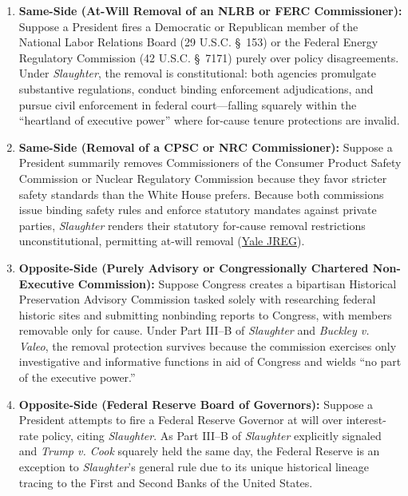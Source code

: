 \documentclass[12pt]{article}
\begin{document}
\begin{enumerate}
    \item \textbf{Same-Side (At-Will Removal of an NLRB or FERC Commissioner):} Suppose a President fires a Democratic or Republican member of the National Labor Relations Board (29 U.S.C. \S~153) or the Federal Energy Regulatory Commission (42 U.S.C. \S~7171) purely over policy disagreements. Under \textit{Slaughter}, the removal is constitutional: both agencies promulgate substantive regulations, conduct binding enforcement adjudications, and pursue civil enforcement in federal court---falling squarely within the ``heartland of executive power'' where for-cause tenure protections are invalid.
    \item \textbf{Same-Side (Removal of a CPSC or NRC Commissioner):} Suppose a President summarily removes Commissioners of the Consumer Product Safety Commission or Nuclear Regulatory Commission because they favor stricter safety standards than the White House prefers. Because both commissions issue binding safety rules and enforce statutory mandates against private parties, \textit{Slaughter} renders their statutory for-cause removal restrictions unconstitutional, permitting at-will removal (\href{https://www.yalejreg.com/nc/implications-of-trump-v-slaughter-for-the-integrity-of-future-federal-commission-decisionmaking/}{Yale JREG}).
    \item \textbf{Opposite-Side (Purely Advisory or Congressionally Chartered Non-Executive Commission):} Suppose Congress creates a bipartisan Historical Preservation Advisory Commission tasked solely with researching federal historic sites and submitting nonbinding reports to Congress, with members removable only for cause. Under Part III--B of \textit{Slaughter} and \textit{Buckley v. Valeo}, the removal protection survives because the commission exercises only investigative and informative functions in aid of Congress and wields ``no part of the executive power.''
    \item \textbf{Opposite-Side (Federal Reserve Board of Governors):} Suppose a President attempts to fire a Federal Reserve Governor at will over interest-rate policy, citing \textit{Slaughter}. As Part III--B of \textit{Slaughter} explicitly signaled and \textit{Trump v. Cook} squarely held the same day, the Federal Reserve is an exception to \textit{Slaughter}'s general rule due to its unique historical lineage tracing to the First and Second Banks of the United States.

\end{enumerate}
\end{document}
